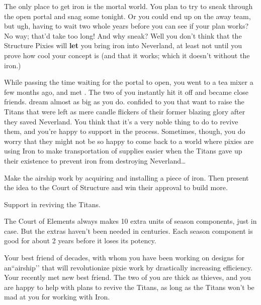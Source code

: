 \documentclass[char]{PP}
\begin{document}
The only place to get iron is the mortal world. You plan to try to sneak through the open portal and snag some tonight. Or you could end up on the away team, but ugh, having to wait two whole years before you can see if your plan works? No way; that'd take too long! And why sneak? Well you don't think that the Structure Pixies will \textbf{let} you bring iron into Neverland, at least not until you prove how cool your concept is (and that it works; which it doesn't without the iron.)

While passing the time waiting for the portal to open, you went to a tea mixer a few months ago, and met \cFTitan{}. The two of you instantly hit it off and became close friends. \cFTitan{\They} dream\cFTitan{\verbs} almost as big as you do. \cFTitan{} confided to you that \cFTitan{\they} want\cFTitan{\verbs} to raise the Titans that were left as mere candle flickers of their former blazing glory after they saved Neverland. You think that it's a very noble thing to do to revive them, and you're happy to support \cFTitan{} in the process. Sometimes, though, you do worry that they might not be so happy to come back to a world where pixies are using Iron to make transportation of supplies easier when the Titans gave up their existence to prevent iron from destroying Neverland\ldots


\begin{itemz}
	\item Make the airship work by acquiring and installing a piece of iron. Then present the idea to the Court of Structure and win their approval to build more.
	\item Support \cFTitan{} in reviving the Titans.
\end{itemz}

\begin{itemz}[Notes]
	\item The Court of Elements always makes 10 extra units of season components, just in case. But the extras haven't been needed in centuries. Each season component is good for about 2 years before it loses its potency.
\end{itemz}

\begin{contacts}
	\contact{\cMAirship{}} Your best friend of decades, with whom you have been working on designs for an``airship'’ that will revolutionize pixie work by drastically increasing efficiency.
	\contact{\cFTitan{}} Your recently met new best friend. The two of you are thick as thieves, and you are happy to help \cFTitan{\them} with \cFTitan{\their} plans to revive the Titans, as long as the Titans won't be mad at you for working with Iron.
\end{contacts}
\end{document}
